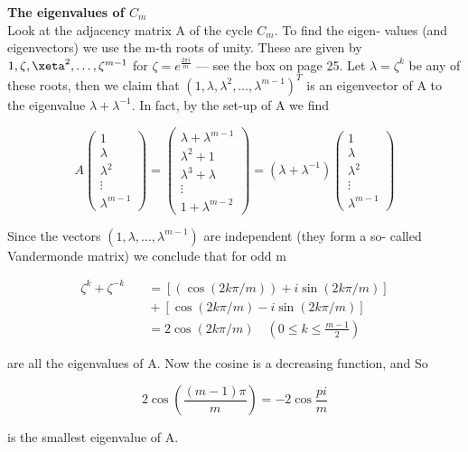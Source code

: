 \documentclass[12pt]{memoir}
\begin{document}
\begin{mdframed}[nobreak=true]
\vspace{8pt}
{\Large\textbf{The eigenvalues of $C_m$}}\\
[5pt]

Look at the adjacency matrix A of the cycle $C_m$. To find the eigen-
values (and eigenvectors) we use the m-th roots of unity. These are 
given by $1, \zeta, \xeta^2, \ldots, \zeta^{m-1}$ for $\zeta = e^{\frac{2\pi i}{m}}$ --- see the box on page 25. 
Let $\lambda = \zeta ^k$  be any of these roots, then we claim that
$(1, \lambda, \lambda^2, \ldots, \lambda^{m-1})^T$  is an eigenvector of A to the eigenvalue $\lambda + \lambda^{-1}$.
In fact, by the set-up of A we find

\[
A \begin{pmatrix} 1 \\ \lambda \\ \lambda^2 \\ \vdots \\ \lambda^{m-1} \end{pmatrix}=
\begin{pmatrix} \lambda + \lambda^{m-1} \\ \lambda^2 + 1 \\ \lambda^3 + \lambda \\ \vdots \\ 1+\lambda^{m-2} \end{pmatrix} =
(\lambda + \lambda^{-1}) \begin{pmatrix} 1 \\ \lambda \\ \lambda^2 \\ \vdots \\ \lambda^{m-1} \end{pmatrix} 
\]

Since the vectors $(1, \lambda, \ldots, \lambda^{m-1})$ are independent (they form a so-
called Vandermonde matrix) we conclude that for odd m

\begin{equation*}
\begin{aligned}
    \zeta^k + \zeta^{-k}&\quad = [(\cos(2k\pi / m)) + i\sin(2k\pi / m)]\\
&\quad + [\cos(2k\pi/m) - i\sin(2k\pi / m)]\\
&\quad =  2\cos(2k\pi / m) \quad (0 \leq k \leq {\frac{m-1}{2}})
\end{aligned}
\end{equation*}

are all the eigenvalues of A. Now the cosine is a decreasing function,
and So

\[
    2\cos({\frac{(m-1)\pi}{m}}) = -2\cos{\frac{pi}{m}}
\]

is the smallest eigenvalue of A. 

\vspace{5pt}
\end{mdframed}


\end{document}
